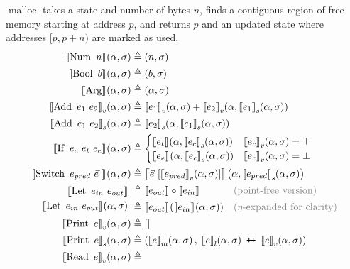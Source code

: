 $\operatorname{malloc}$ takes a state and number of bytes $n$, finds a contiguous region of free memory starting at address $p$, and returns $p$ and an updated state where addresses $[p,p+n)$ are marked as used.
\begin{align*}
\denotef{\uop{Num}{n}}{\targ,\tmem} &\eqdef
  \left(n,\tmem\right)\\
%
\denotef{\uop{Bool}{b}}{\targ,\tmem} &\eqdef
  \left(b,\tmem\right)\\
%
\denotef{\mathrm{Arg}}{\targ,\tmem} &\eqdef
  \left(\targ,\tmem\right)\\
%
\denotefv{\bop{Add}{e_1}{e_2}}{\targ,\tmem} &\eqdef
  \denotefv{e_1}{\targ,\tmem} +
  \denotefv{e_2}{\targ,\denotefs{e_1}{\targ,\tmem}}\\
%
\denotefs{\bop{Add}{e_1}{e_2}}{\targ,\tmem} &\eqdef
  \denotefs{e_2}{\targ,\denotefs{e_1}{\targ,\tmem}}\\
%
\denotef{\trop{If}{e_c}{e_t}{e_e}}{\targ,\tmem} &\eqdef
  \begin{cases}
    \denotef{e_t}{\targ,\denotefs{e_c}{\targ,\tmem}} &
      \denotefv{e_c}{\targ,\tmem} = \top\\
    \denotef{e_e}{\targ,\denotefs{e_c}{\targ,\tmem}} &
      \denotefv{e_c}{\targ,\tmem} = \bot
  \end{cases}\\
%
\denotef{\bop{Switch}{e_{pred}}{\Vec{e}\ }}{\targ,\tmem} &\eqdef
  \denotef{\Vec{e}\ [\denotefv{e_{pred}}{\targ,\tmem}]}{\targ,\denotefs{e_{pred}}{\targ,\tmem}}\\
\begin{aligned}
\denote{\bop{Let}{e_{in}}{e_{out}}}&\\
\denotef{\bop{Let}{e_{in}}{e_{out}}}{\targ,\tmem}&
\end{aligned}
\ &\begin{aligned}
  &\eqdef \denote{e_{out}} \circ \denote{e_{in}}
  &&\text{\color{gray}(point-free version)}\\
  &\eqdef \denotef{e_{out}}{\denotef{e_{in}}{\targ,\tmem}}
  &&\text{\color{gray}($\eta$-expanded for clarity)}\\
\end{aligned}\\
%
\denotefv{\uop{Print}{e}}{\targ,\tmem} &\eqdef []\\
\denotefs{\uop{Print}{e}}{\targ,\tmem} &\eqdef
  (\denotefsub{m}{e}{\targ,\tmem},\;
   \append{\denotefsub{l}{e}{\targ,\tmem}}{\denotefv{e}{\targ,\tmem}})\\
%
\denotefv{\uop{Read}{e}}{\targ,\tmem} &\eqdef

\end{align*}
